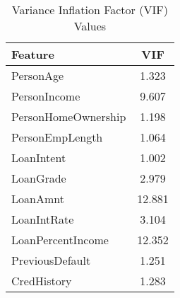 \begin{table}[H]\centering
\caption{Variance Inflation Factor (VIF) Values}
\label{Table 4:vif_values}
\begin{tabular}{lc}
\toprule
Feature & VIF \\
\midrule
PersonAge & 1.323 \\
PersonIncome & 9.607 \\
PersonHomeOwnership & 1.198 \\
PersonEmpLength & 1.064 \\
LoanIntent & 1.002 \\
LoanGrade & 2.979 \\
LoanAmnt & 12.881 \\
LoanIntRate & 3.104 \\
LoanPercentIncome & 12.352 \\
PreviousDefault & 1.251 \\
CredHistory & 1.283 \\
\bottomrule
\end{tabular}
\end{table}
